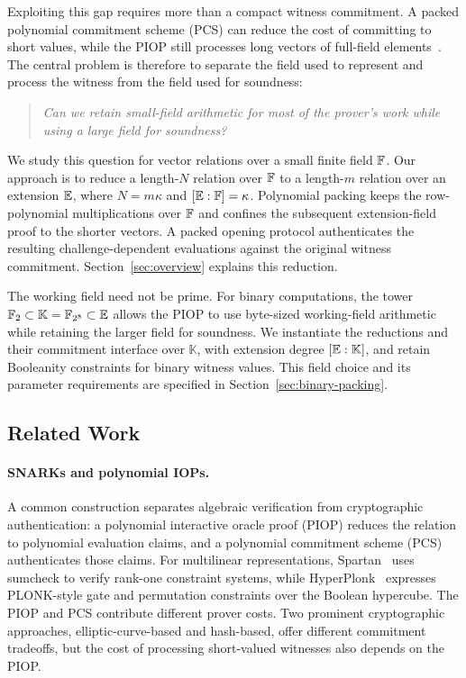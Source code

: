 Exploiting this gap requires more than a compact witness commitment.
A packed polynomial commitment scheme (PCS) can reduce the cost of
committing to short values, while the PIOP still processes long vectors
of full-field elements~\cite{eurocrypt/DiamondP26,iacr/BagadDDT25}.
The central problem is therefore to separate the field used to
represent and process the witness from the field used for soundness:
\begin{quote}
\emph{Can we retain small-field arithmetic for most of the prover's
work while using a large field for soundness?}
\end{quote}

We study this question for vector relations over a small finite
field \({\mathbb{F}}\).
Our approach is to reduce a length-\(N\) relation over \({\mathbb{F}}\)
to a length-\(m\) relation over an extension \(\mathbb{E}\),
where \(N=m\kappa\) and \([\mathbb{E}:{\mathbb{F}}]=\kappa\).
Polynomial packing keeps the row-polynomial multiplications over
\({\mathbb{F}}\) and confines the subsequent extension-field proof to
the shorter vectors.
A packed opening protocol authenticates the resulting
challenge-dependent evaluations against the original witness
commitment. Section~\ref{sec:overview} explains this reduction.

The working field need not be prime. For binary computations,
the tower \(\mathbb F_2\subset\mathbb K=\mathbb F_{2^8}
\subset\mathbb{E}\) allows the PIOP to use byte-sized
working-field arithmetic while retaining the larger field for
soundness. We instantiate the reductions and their commitment
interface over \(\mathbb K\), with extension degree
\([\mathbb{E}:\mathbb K]\), and retain Booleanity constraints
for binary witness values. This field choice and its parameter
requirements are specified in Section~\ref{sec:binary-packing}.

\subsection{Related Work}
\label{sec:related-work}

\paragraph{SNARKs and polynomial IOPs.}
A common construction separates algebraic verification
from cryptographic authentication: a polynomial interactive oracle
proof (PIOP) reduces the relation to polynomial evaluation claims,
and a polynomial commitment scheme (PCS) authenticates those claims.
For multilinear representations, Spartan~\cite{crypto/Setty20} uses
sumcheck to verify rank-one constraint systems, while
HyperPlonk~\cite{eurocrypt/ChenBBZ23} expresses PLONK-style gate and
permutation constraints over the Boolean hypercube.
The PIOP and PCS contribute different prover costs.
Two prominent cryptographic approaches, elliptic-curve-based and
hash-based, offer different commitment tradeoffs, but the cost of
processing short-valued witnesses also depends on the PIOP.


